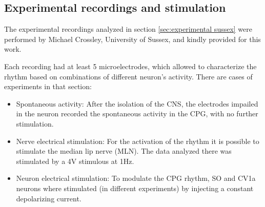


\subsection{Experimental recordings and stimulation}
The experimental recordings analyzed in section \ref{sec:experimental sussex} were performed by Michael Crossley, University of Sussex, and kindly provided for this work. 

Each recording had at least 5 microelectrodes, which allowed to characterize the rhythm based on combinations of different neuron's activity. There are cases of experiments in that section:
\begin{itemize}
	\item Spontaneous activity: After the isolation of the CNS, the electrodes impailed in the neuron recorded the spontaneous activity in the CPG, with no further stimulation.
	\item Nerve electrical stimulation: For the activation of the rhythm it is possible to stimulate the median lip nerve (MLN). The data analyzed there was stimulated by a 4V stimulous at 1Hz. 
	\item Neuron electrical stimulation: To modulate the CPG rhythm, SO and CV1a neurons where stimulated (in different experiments) by injecting a constant depolarizing current.
\end{itemize}

